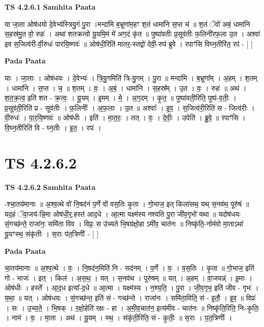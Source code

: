 \documentclass[17pt]{extarticle}
\begin{document}
\textbf{TS 4.2.6.1 } \newline
\textbf{Samhita Paata} \newline

या जा॒ता ओष॑धयो दे॒वेभ्य॑स्त्रियु॒गं पु॒रा ।मन्दा॑मि ब॒भ्रूणा॑म॒हꣳ श॒तं धामा॑नि स॒प्त च॑ ॥ श॒तं ॅवो॑ अबं॒ धामा॑नि स॒हस्र॑मु॒त वो॒ रुहः॑ । अथा॑ शतक्रत्वो यू॒यमि॒मं मे॑ अग॒दं कृ॑त ॥ पुष्पा॑वतीः प्र॒सूव॑तीः फ॒लिनी॑रफ॒ला उ॒त । अश्वा॑ इव स॒जित्व॑री-र्वी॒रुधः॑ पारयि॒ष्णवः॑ ॥ ओष॑धी॒रिति॑ मातर॒-स्तद्वो॑ देवी॒-रुप॑ ब्रुवे । रपाꣳ॑सि विघ्न॒तीरि॑त॒ रप॑ - [  ] \newline

\textbf{Pada Paata} \newline

याः । जा॒ताः । ओष॑धयः । दे॒वेभ्यः॑ । त्रि॒यु॒गमिति॑ त्रि-यु॒गम् । पु॒रा ॥ मन्दा॑मि । ब॒भ्रूणा᳚म् । अ॒हम् । श॒तम् । धामा॑नि । स॒प्त । च॒ ॥ श॒तम् । वः॒ । अ॒बं॒ । धामा॑नि । स॒हस्र᳚म् । उ॒त । वः॒ । रुहः॑ ॥ अथ॑ । श॒त॒क्र॒त्व॒ इति॑ शत - क्र॒त्वः॒ । यू॒यम् । इ॒मम् । मे॒ । अ॒ग॒दम् । कृ॒त॒ ॥ पुष्पा॑वती॒रिति॒ पुष्प॑-व॒तीः॒ । प्र॒सूव॑ती॒रिति॑ प्र - सूव॑तीः । फ॒लिनीः᳚ । अ॒फ॒लाः । उ॒त ॥ अश्वाः᳚ । इ॒व॒ । स॒जित्व॑री॒रिति॑ स - जित्व॑रीः । वी॒रुधः॑ । पा॒र॒यि॒ष्णवः॑ ॥ ओष॑धीः । इति॑ । मा॒त॒रः॒ । तत् । वः॒ । दे॒वीः॒ । उपेति॑ । ब्रु॒वे॒ ॥ रपाꣳ॑सि । वि॒घ्न॒तीरिति॑ वि - घ्न॒तीः । इ॒त॒ । रपः॑ ।  \newline





\section{ TS 4.2.6.2 }

\textbf{TS 4.2.6.2 } \newline
\textbf{Samhita Paata} \newline

-श्चा॒तय॑मानाः ॥ अ॒श्व॒त्थे वो॑ नि॒षद॑नं प॒र्णे वो॑ वस॒तिः कृ॒ता । गो॒भाज॒ इत् किला॑सथ॒ यथ् स॒नव॑थ॒ पूरु॑षं ॥ यद॒हं ॅवा॒जय॑-न्नि॒मा ओष॑धी॒र्॒.हस्त॑ आद॒धे । आ॒त्मा यक्ष्म॑स्य नश्यति पु॒रा जी॑व॒गृभो॑ यथा ॥ यदोष॑धयः सं॒गच्छ॑न्ते॒ राजा॑नः॒ समि॑ता विव । विप्रः॒ स उ॑च्यते भि॒षग्र॑क्षो॒हा ऽमी॑व॒ चात॑नः ॥ निष्कृ॑ति॒-र्नाम॑वो मा॒ताऽथा॑ यू॒यꣳस्थ॒ संकृ॑तीः । स॒राः प॑त॒त्रिणीः᳚ - [  ] \newline

\textbf{Pada Paata} \newline

चा॒तय॑मानाः ॥ अ॒श्व॒त्थे । वः॒ । नि॒षद॑न॒मिति॑ नि - सद॑नम् । प॒र्णे । वः॒ । व॒स॒तिः । कृ॒ता ॥ गो॒भाज॒ इति॑ गो - भाजः॑ । इत् । किल॑ । अ॒स॒थ॒ । यत् । स॒नव॑थ । पूरु॑षम् ॥ यत् । अ॒हम् । वा॒जयन्न्॑ । इ॒माः । ओष॑धीः । हस्ते᳚ । आ॒द॒ध इत्या᳚-द॒धे ॥ आ॒त्मा । यक्ष्म॑स्य । न॒श्य॒ति॒ । पु॒रा । जी॒व॒गृभ॒ इति॑ जीव - गृभः॑ । य॒था॒ ॥ यत् । ओष॑धयः । सं॒गच्छ॑न्त॒ इति॑ सं - गच्छ॑न्ते । राजा॑नः । समि॑ता॒विति॒ सं - इ॒तौ॒ । इ॒व॒ ॥ विप्रः॑ । सः । उ॒च्य॒ते॒ । भि॒षक् । र॒क्षो॒हेति॑ रक्षः - हा । अ॒मी॒व॒चात॑न॒ इत्य॑मीव - चात॑नः ॥ निष्कृ॑ति॒रिति॒ निः-कृ॒तिः॒ । नाम॑ । वः॒ । मा॒ता । अथ॑ । यू॒यम् । स्थ॒ । संकृ॑ती॒रिति॒ सं - कृ॒तीः॒ ॥ स॒राः । प॒त॒त्रिणीः᳚ ।  \newline
\end{document}
